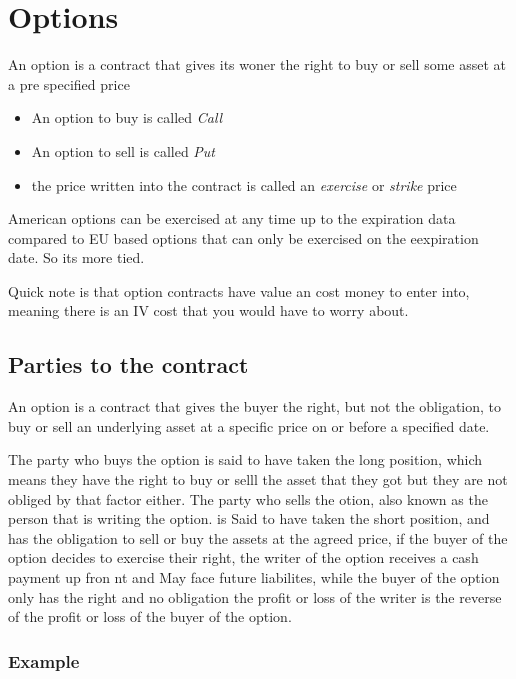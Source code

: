 \documentclass{article}
\theoremstyle{mytheoremstyle}
\theoremstyle{mytheoremstyle}
\theoremstyle{myproblemstyle}
\begin{document}
\section{Options}
\begin{definition}[Options]
	An option is a contract that gives its woner the right to buy or sell some asset at a pre specified price
	\begin{itemize}
		\item An option to buy is called \textit{Call}
		\item An option to sell is called \textit{Put}
		\item the price written into the contract is called an \textit{exercise} or \textit{strike} price
	\end{itemize}

	American options can be exercised at any time up to the expiration data
	compared to EU based options that can only be exercised on the eexpiration date. So its more tied.

	Quick note is that option contracts have value an cost money to enter into, meaning there is an IV cost that you would have to worry about.

\end{definition}

\subsection{Parties to the contract}
An option is a contract that gives the buyer the right, but not the obligation, to buy or sell an underlying asset at a specific price on or before a specified date.

The party who buys the option is said to have taken the long position, which means they have the right to buy or selll the asset that they got but they are not obliged by that factor either.
The party who sells the otion, also known as the person that is writing the option. is Said to have taken the short position, and has the obligation to sell or buy the assets at the agreed price, if the buyer of the option decides to exercise their right, the writer of the option receives a cash payment up fron nt and May face future liabilites, while the buyer of the option only has the right and no obligation the profit or loss of the writer is the reverse of the profit or loss of the buyer of the option.

\subsubsection{Example}
\end{document}
